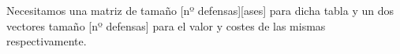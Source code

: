 Necesitamos una matriz de tamaño [nº defensas][ases] para dicha tabla y un dos vectores tamaño [nº defensas] para el valor y costes de las mismas respectivamente.

